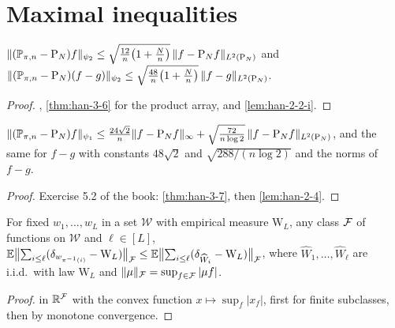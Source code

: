 \section{Maximal inequalities}

\begin{theorem}
  \label{thm:han-5-2}
  $\|(\mathbb{P}_{\pi,n}-\mathrm{P}_N)f\|_{\psi_2}\le\sqrt{\frac{12}n\bigl(1+\frac Nn\bigr)}\,\|f-\mathrm{P}_N f\|_{L^2(\mathrm{P}_N)}$ and
  $\|(\mathbb{P}_{\pi,n}-\mathrm{P}_N)(f-g)\|_{\psi_2}\le\sqrt{\frac{48}n\bigl(1+\frac Nn\bigr)}\,\|f-g\|_{L^2(\mathrm{P}_N)}$.
\end{theorem}
\begin{proof}
  , \cref{thm:han-3-6} for the product array, and \cref{lem:han-2-2-i}.
\end{proof}

\begin{theorem}
  \label{thm:han-5-3}
  $\|(\mathbb{P}_{\pi,n}-\mathrm{P}_N)f\|_{\psi_1}\le\frac{24\sqrt2}n\|f-\mathrm{P}_N f\|_\infty+\sqrt{\frac{72}{n\log2}}\,\|f-\mathrm{P}_N f\|_{L^2(\mathrm{P}_N)}$, and the same for $f-g$ with constants $48\sqrt2$ and $\sqrt{288/(n\log2)}$ and the norms of $f-g$.
\end{theorem}
\begin{proof}
  Exercise 5.2 of the book: \cref{thm:han-3-7}, then \cref{lem:han-2-4}.
\end{proof}

\begin{corollary}
  \label{cor:han-5-1}
  For fixed $w_1,\dots,w_L$ in a set $\mathcal W$ with empirical measure $\mathrm W_L$, any class $\mathcal{F}$ of functions on $\mathcal W$ and $\ell\in[L]$,
  $\mathbb{E}\bigl\|\sum_{i\le\ell}(\delta_{w_{\pi^{-1}(i)}}-\mathrm W_L)\bigr\|_{\mathcal{F}}\le\mathbb{E}\bigl\|\sum_{i\le\ell}(\delta_{\widehat W_i}-\mathrm W_L)\bigr\|_{\mathcal{F}}$,
  where $\widehat W_1,\dots,\widehat W_\ell$ are i.i.d.\ with law $\mathrm W_L$ and $\|\mu\|_{\mathcal{F}}=\sup_{f\in\mathcal{F}}|\mu f|$.
\end{corollary}
\begin{proof}
   in $\mathbb{R}^{\mathcal{F}}$ with the convex function $x\mapsto\sup_f|x_f|$, first for finite subclasses, then by monotone convergence.
\end{proof}

